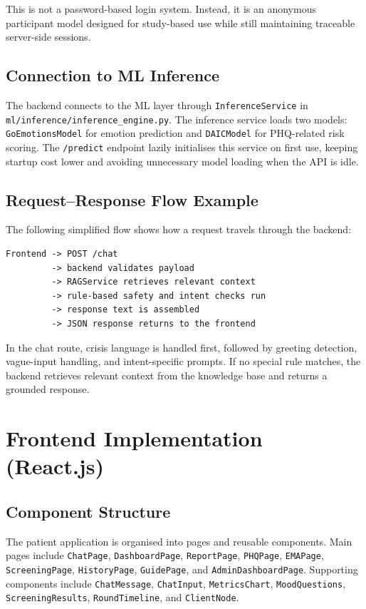 This is not a password-based login system. Instead, it is an anonymous participant model designed for study-based use while still maintaining traceable server-side sessions.

\subsection{Connection to ML Inference}

The backend connects to the ML layer through \texttt{InferenceService} in \texttt{ml/inference/inference\_engine.py}. The inference service loads two models: \texttt{GoEmotionsModel} for emotion prediction and \texttt{DAICModel} for PHQ-related risk scoring. The \texttt{/predict} endpoint lazily initialises this service on first use, keeping startup cost lower and avoiding unnecessary model loading when the API is idle.

\subsection{Request--Response Flow Example}

The following simplified flow shows how a request travels through the backend:

\begin{verbatim}
Frontend -> POST /chat
         -> backend validates payload
         -> RAGService retrieves relevant context
         -> rule-based safety and intent checks run
         -> response text is assembled
         -> JSON response returns to the frontend
\end{verbatim}

In the chat route, crisis language is handled first, followed by greeting detection, vague-input handling, and intent-specific prompts. If no special rule matches, the backend retrieves relevant context from the knowledge base and returns a grounded response.

\section{Frontend Implementation (React.js)}

\subsection{Component Structure}

The patient application is organised into pages and reusable components. Main pages include \texttt{ChatPage}, \texttt{DashboardPage}, \texttt{ReportPage}, \texttt{PHQPage}, \texttt{EMAPage}, \texttt{ScreeningPage}, \texttt{HistoryPage}, \texttt{GuidePage}, and \texttt{AdminDashboardPage}. Supporting components include \texttt{ChatMessage}, \texttt{ChatInput}, \texttt{MetricsChart}, \texttt{MoodQuestions}, \texttt{ScreeningResults}, \texttt{RoundTimeline}, and \texttt{ClientNode}.

